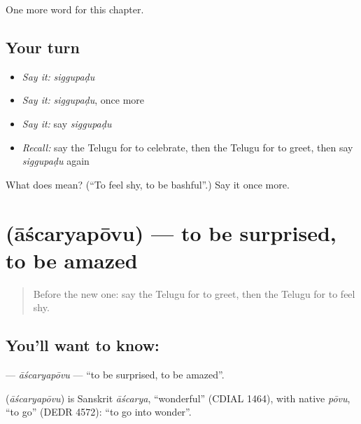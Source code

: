 \begin{grammarlens}[title={What you've built}]
One more word for this chapter.
\end{grammarlens}

\subsection*{Your turn}
\begin{itemize}
\raggedright
  \item \emph{Say it:} \emph{siggupaḍu}
  \item \emph{Say it:} \emph{siggupaḍu}, once more
  \item \emph{Say it:} say \emph{siggupaḍu}
  \item \emph{Recall:} say the Telugu for to celebrate, then the Telugu for to greet, then say \emph{siggupaḍu} again
\end{itemize}

\begin{tcolorbox}[breakable,colback=teal!4,colframe=teal!35!black,title={Before you move on}]
What does  mean? (\textquotedblleft{}To feel shy, to be bashful\textquotedblright{}.) Say it once more.
\end{tcolorbox}
\section[\texorpdfstring{\te{ఆశ్చర్యపోవు} (āścaryapōvu)}{ఆశ్చర్యపోవు (āścaryapōvu)}]{ (āścaryapōvu) — to be surprised, to be amazed}

\label{lesson:TE-C161-ascaryapovu}



\begin{quote}
Before the new one: say the Telugu for to greet, then the Telugu for to feel shy.
\end{quote}

\subsection*{You'll want to know: }
\textbf{} — \emph{āścaryapōvu} — \textquotedblleft{}to be surprised, to be amazed\textquotedblright{}.

\begin{cousinweb}
\textbf{} (\emph{āścaryapōvu}) is Sanskrit \emph{āścarya}, \textquotedblleft{}wonderful\textquotedblright{} (CDIAL 1464), with native \emph{pōvu}, \textquotedblleft{}to go\textquotedblright{} (DEDR 4572): \textquotedblleft{}to go into wonder\textquotedblright{}.
\end{cousinweb}

